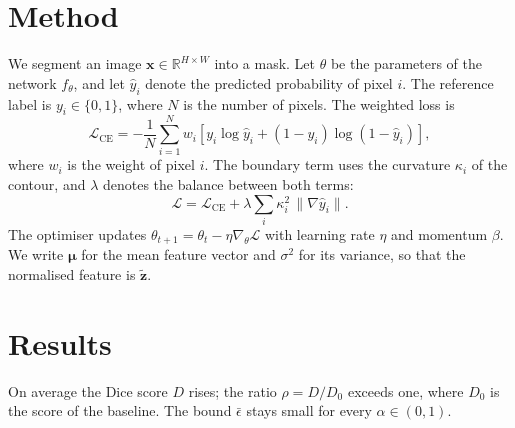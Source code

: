 \documentclass[11pt]{article}
\begin{document}
\section{Method}
We segment an image $\mathbf{x} \in \mathbb{R}^{H \times W}$ into a mask. Let $\theta$ be the
parameters of the network $f_{\theta}$, and let $\hat{y}_i$ denote the predicted probability
of pixel $i$. The reference label is $y_i \in \{0, 1\}$, where $N$ is the number of pixels.
The weighted loss is
\begin{equation}
  \mathcal{L}_{\mathrm{CE}} = -\frac{1}{N} \sum_{i=1}^{N} w_i \left[ y_i \log \hat{y}_i + (1 - y_i) \log (1 - \hat{y}_i) \right],
\end{equation}
where $w_i$ is the weight of pixel $i$. The boundary term uses the curvature $\kappa_i$ of the
contour, and $\lambda$ denotes the balance between both terms:
\begin{equation}
  \mathcal{L} = \mathcal{L}_{\mathrm{CE}} + \lambda \sum_{i} \kappa_i^{2} \, \| \nabla \hat{y}_i \|.
\end{equation}
The optimiser updates $\theta_{t+1} = \theta_t - \eta \nabla_{\theta} \mathcal{L}$ with learning
rate $\eta$ and momentum $\beta$. We write $\bm{\mu}$ for the mean feature vector and
$\sigma^{2}$ for its variance, so that the normalised feature is $\tilde{\mathbf{z}}$.
\section{Results}
On average the Dice score $D$ rises; the ratio $\rho = D / D_{0}$ exceeds one, where $D_{0}$ is
the score of the baseline. The bound $\bar{\epsilon}$ stays small for every $\alpha \in (0, 1)$.
\end{document}
